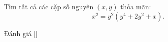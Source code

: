 \ifshowproblem
\begin{problem}\label{problem:FRA-2015-TST4-P6}
    Tìm tất cả các cặp số nguyên \( (x, y) \) thỏa mãn:
    \[
        x^2 = y^2(y^4 + 2y^2 + x).
    \]
\end{problem}
\fi

\ifshowinfo
Đánh giá [\textbf{}]
\fi